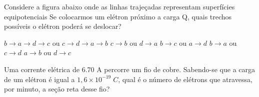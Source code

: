 \documentclass[12pt, addpoints]{exam}
\begin{document}
        \begin{questions}
\begin{multicols*}{2}
\question Considere a figura abaixo onde as linhas trajeçadas representam superfícies equipotenciais Se colocarmos um elétron próximo a carga Q, quais trechos possíveis o elétron poderá se deslocar?
        
        \begin{center}
            \begin{minipage}[c]{0.5\linewidth}
            \end{minipage}
        \end{center}
        
        

\begin{choices}
\choice $b\rightarrow a\rightarrow d\rightarrow c$ ou $c\rightarrow d\rightarrow a\rightarrow b$ 
\choice $c\rightarrow b$ ou $d\rightarrow a$ 
\choice $b\rightarrow c$ ou $a\rightarrow d$ 
\choice $b\rightarrow a$ ou $c\rightarrow d$ 
\choice $a\rightarrow b$ ou $d\rightarrow c$ 
\end{choices}
\question Uma corrente elétrica de    6.70 A percorre um ﬁo de cobre. Sabendo-se que a carga de um elétron é igual a $1,6\times 10^{-19}\;C$, qual é o número de elétrons que atravessa, por minuto, a seção reta desse ﬁo?


\end{multicols*}
\end{questions}
\end{document}
